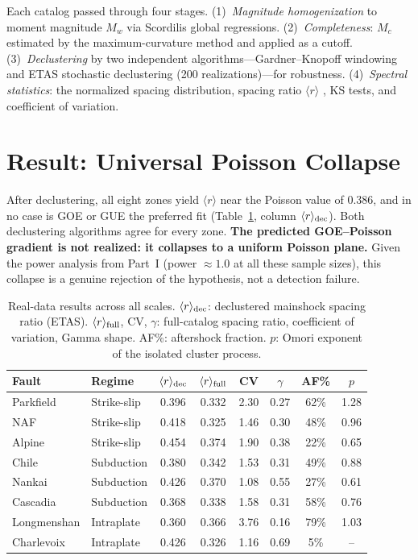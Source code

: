 \documentclass[12pt,a4paper]{article}
\begin{document}
Each catalog passed through four stages. (1)~\emph{Magnitude homogenization} to moment magnitude $M_w$ via Scordilis \citep{scordilis2006} global regressions. (2)~\emph{Completeness}: $M_c$ estimated by the maximum-curvature method and applied as a cutoff. (3)~\emph{Declustering} by two independent algorithms---Gardner--Knopoff windowing \citep{gardner1974} and ETAS stochastic declustering \citep{zhuang2002} (200 realizations)---for robustness. (4)~\emph{Spectral statistics}: the normalized spacing distribution, spacing ratio $\langle r\rangle$ \citep{atas2013}, KS tests, and coefficient of variation.

\section{Result: Universal Poisson Collapse}

After declustering, all eight zones yield $\langle r\rangle$ near the Poisson value of 0.386, and in no case is GOE or GUE the preferred fit (Table~\ref{tab:main}, column $\langle r\rangle_{\rm dec}$). Both declustering algorithms agree for every zone. \textbf{The predicted GOE--Poisson gradient is not realized: it collapses to a uniform Poisson plane.} Given the power analysis from Part~I (power $\approx1.0$ at all these sample sizes), this collapse is a genuine rejection of the hypothesis, not a detection failure.

\begin{table}[H]
\centering
\caption{Real-data results across all scales. $\langle r\rangle_{\rm dec}$: declustered mainshock spacing ratio (ETAS). $\langle r\rangle_{\rm full}$, CV, $\gamma$: full-catalog spacing ratio, coefficient of variation, Gamma shape. AF\%: aftershock fraction. $p$: Omori exponent of the isolated cluster process.}
\label{tab:main}
\small
\begin{tabular}{llcccccc}
\toprule
Fault & Regime & $\langle r\rangle_{\rm dec}$ & $\langle r\rangle_{\rm full}$ & CV & $\gamma$ & AF\% & $p$ \\
\midrule
Parkfield & Strike-slip & 0.396 & 0.332 & 2.30 & 0.27 & 62\% & 1.28 \\
NAF & Strike-slip & 0.418 & 0.325 & 1.46 & 0.30 & 48\% & 0.96 \\
Alpine & Strike-slip & 0.454 & 0.374 & 1.90 & 0.38 & 22\% & 0.65 \\
Chile & Subduction & 0.380 & 0.342 & 1.53 & 0.31 & 49\% & 0.88 \\
Nankai & Subduction & 0.426 & 0.370 & 1.08 & 0.55 & 27\% & 0.61 \\
Cascadia & Subduction & 0.368 & 0.338 & 1.58 & 0.31 & 58\% & 0.76 \\
Longmenshan & Intraplate & 0.360 & 0.366 & 3.76 & 0.16 & 79\% & 1.03 \\
Charlevoix & Intraplate & 0.426 & 0.326 & 1.16 & 0.69 & 5\% & -- \\
\bottomrule
\end{tabular}
\end{table}
\end{document}
